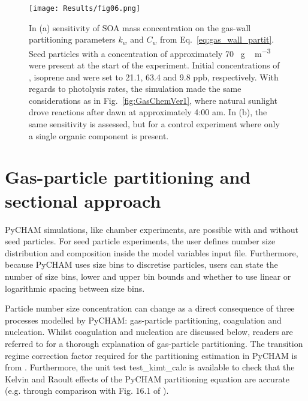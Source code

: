 \documentclass[gmd, manuscript]{copernicus}
\begin{document}
\begin{figure}[t]
\texttt{[image: Results/fig06.png]}
\caption{In (a) sensitivity of SOA mass concentration on the gas-wall partitioning parameters $k_{w}$ and $C_{w}$ from Eq.~\ref{eq:gas_wall_partit}.  Seed particles with a concentration of approximately 70 \unit{\mu g\, m^{-3}} were present at the start of the experiment.  Initial concentrations of , isoprene and  were set to 21.1, 63.4 and 9.8 \unit{ppb}, respectively.  With regards to photolysis rates, the simulation made the same considerations as in Fig.~\ref{fig:GasChemVer1}, where natural sunlight drove reactions after dawn at approximately 4:00 am.  In (b), the same sensitivity is assessed, but for a control experiment where only a single organic component is present.}
\label{fig:Gaswall_sens_fig}
\end{figure}

\section{Gas-particle partitioning and sectional approach}\label{sec:gp_part}

PyCHAM simulations, like chamber experiments, are possible with and without seed particles.  For seed particle experiments, the user defines number size distribution and composition inside the model variables input file.  Furthermore, because PyCHAM uses size bins to discretise particles, users can state the number of size bins, lower and upper bin bounds and whether to use linear or logarithmic spacing between size bins.  

Particle number size concentration can change as a direct consequence of three processes modelled by PyCHAM: gas-particle partitioning, coagulation and nucleation.  Whilst coagulation and nucleation are discussed below, readers are referred to \citet{Zaveri2008} for a thorough explanation of gas-particle partitioning.  The transition regime correction factor required for the partitioning estimation in PyCHAM is from \citet{Fuchs1971}.  Furthermore, the unit test test\_kimt\_calc is available to check that the Kelvin and Raoult effects of the PyCHAM partitioning equation are accurate (e.g. through comparison with Fig. 16.1 of \citet{Jacobson2005}).
\end{document}
